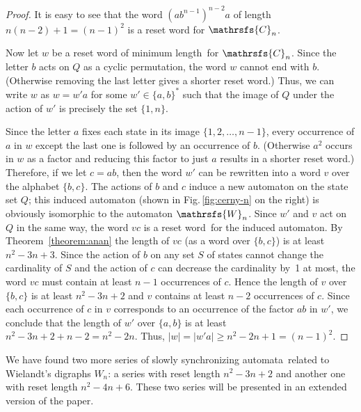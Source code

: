 \documentclass[11pt]{llncs}
\newcommand{\sa}{synchronizing automata}
\newcommand{\sw}{reset word}
\newcommand{\ssw}{reset word of minimum length}
\begin{document}
\begin{proof}
It is easy to see that the word $(ab^{n-1})^{n-2}a$ of length
$n(n-2)+1=(n-1)^2$ is a reset word for $\mathrsfs{C}_n$.

Now let $w$ be a \ssw\ for $\mathrsfs{C}_n$. Since the letter $b$
acts on $Q$ as a cyclic permutation, the word $w$ cannot end with $b$.
(Otherwise removing the last letter gives a shorter \sw.) Thus, we can
write $w$ as $w = w'a$ for some $w'\in\{a,b\}^*$ such that the image
of $Q$ under the action of $w'$ is precisely the set $\{1,n\}$.

Since the letter $a$ fixes each state in its image
$\{1,2,\dots,n-1\}$, every occurrence of $a$ in $w$ except the
last one is followed by an occurrence of $b$. (Otherwise $a^2$
occurs in $w$ as a factor and reducing this factor to just $a$
results in a shorter \sw.) Therefore, if we let $c=ab$, then the
word $w'$ can be rewritten into a word $v$ over the alphabet
$\{b,c\}$. The actions of $b$ and $c$ induce a new automaton on
the state set $Q$; this induced automaton (shown in
Fig.\,\ref{fig:cerny-n} on the right) is obviously isomorphic to
the automaton $\mathrsfs{W}_n$. Since $w'$ and $v$ act on $Q$ in
the same way, the word $vc$ is a \sw\ for the induced automaton.
By Theorem~\ref{theorem:anan} the length of $vc$ (as a word over
$\{b,c\}$) is at least $n^2-3n+3$. Since the action of $b$ on any
set $S$ of states cannot change the cardinality of $S$ and the
action of $c$ can decrease the cardinality by~1 at most, the word
$vc$ must contain at least $n-1$ occurrences of $c$. Hence the
length of $v$ over $\{b,c\}$ is at least $n^2-3n+2$ and $v$
contains at least $n-2$ occurrences of $c$. Since each occurrence
of $c$ in $v$ corresponds to an occurrence of the factor $ab$ in
$w'$, we conclude that the length of $w'$ over $\{a,b\}$ is at
least $n^2-3n+2+n-2=n^2-2n$. Thus, $|w|=|w'a|\ge
n^2-2n+1=(n-1)^2$.
\end{proof}

We have found two more series of slowly \sa\ related to Wielandt's digraphs
$W_n$: a series with reset length $n^2-3n+2$ and another one with reset length
$n^2-4n+6$. These two series will be presented in an extended version of
the paper.
\end{document}
